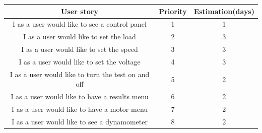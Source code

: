 \documentclass[]{report}
\begin{document}
\begin{table}[H]
	\renewcommand{\arraystretch}{4} %
	\linespread{0.45}\selectfont\centering
	\begin{center}
	\begin{tabular}{ccc}
		\hline
		\multicolumn{1}{|c|}{\textbf{User story}}                                                                                                             & \multicolumn{1}{c|}{\textbf{Priority}} & \multicolumn{1}{c|}{{\textbf {Estimation(days)}}} \\ \hline
		\multicolumn{1}{|c|}{I as a user would like to see a control panel}                                                                                   & \multicolumn{1}{c|}{1}                 & \multicolumn{1}{c|}{1}                \\ \hline
		\multicolumn{1}{|c|}{I as a user would like to set the load}                                                                                          & \multicolumn{1}{c|}{2}                 & \multicolumn{1}{c|}{3}                \\ \hline
		\multicolumn{1}{|c|}{I as a user would like to set the speed}                                                                                         & \multicolumn{1}{c|}{3}                 & \multicolumn{1}{c|}{3}                \\ \hline
		\multicolumn{1}{|c|}{I as a user would like to set the voltage}                                                                                       & \multicolumn{1}{c|}{4}                 & \multicolumn{1}{c|}{3}                \\ \hline
		\multicolumn{1}{|c|}{I as a user would like to turn the test on and off}                                                                              & \multicolumn{1}{c|}{5}                 & \multicolumn{1}{c|}{2}                \\ \hline
		\multicolumn{1}{|c|}{I as a user would like to have a results menu}                                                                                   & \multicolumn{1}{c|}{6}                 & \multicolumn{1}{c|}{2}                \\ \hline
		\multicolumn{1}{|c|}{I as a user would like to have a motor menu}                                                                                     & \multicolumn{1}{c|}{7}                 & \multicolumn{1}{c|}{2}                \\ \hline
		\multicolumn{1}{|c|}{I as a user would like to see a dynamometer}                                                                                     & \multicolumn{1}{c|}{8}                 & \multicolumn{1}{c|}{2}                \\ \hline

\end{tabular}
\end{center}
\end{table}
\end{document}
